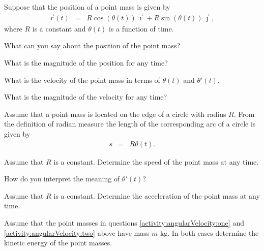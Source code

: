 \begin{problem}
\item Suppose that the position of a point mass is given by
  \begin{eqnarray*}
    \vec{r}(t) & = & R\cos(\theta(t)) \vec{\imath} + R\sin(\theta(t)) \vec{\jmath},
  \end{eqnarray*}
  where $R$ is a constant and $\theta(t)$ is a function of time.
  \label{activity:angularVelocity:one}
  \begin{subproblem}
  \item What can you say about the position of the point mass?
    \vfill
  \item What is the magnitude of the position for any time?
    \vfill
  \item What is the velocity of the point mass in terms of $\theta(t)$
    and $\theta'(t)$.
    \vfill
  \item What is the magnitude of the velocity for any time?
    \vfill
  \end{subproblem}

  \clearpage

\item Assume that a point mass is located on the edge of a circle with
  radius $R$.  From the definition of radian measure the length of the
  corresponding arc of a circle is given by
  \begin{eqnarray*}
    s & = & R \theta(t).
  \end{eqnarray*}
  \label{activity:angularVelocity:two}
  \begin{subproblem}
  \item Assume that $R$ is a constant. Determine the speed of the
    point mass at any time.
    \vfill
  \item How do you interpret the meaning of $\theta'(t)$?
    \vfill
  \item Assume that $R$ is a constant. Determine the acceleration of
    the point mass at any time.
    \vfill
  \end{subproblem}

\clearpage

\item Assume that the point masses in questions
  \ref{activity:angularVelocity:one} and
  \ref{activity:angularVelocity:two} above have mass $m$ kg. In both
  cases determine the kinetic energy of the point masses.

\end{problem}



